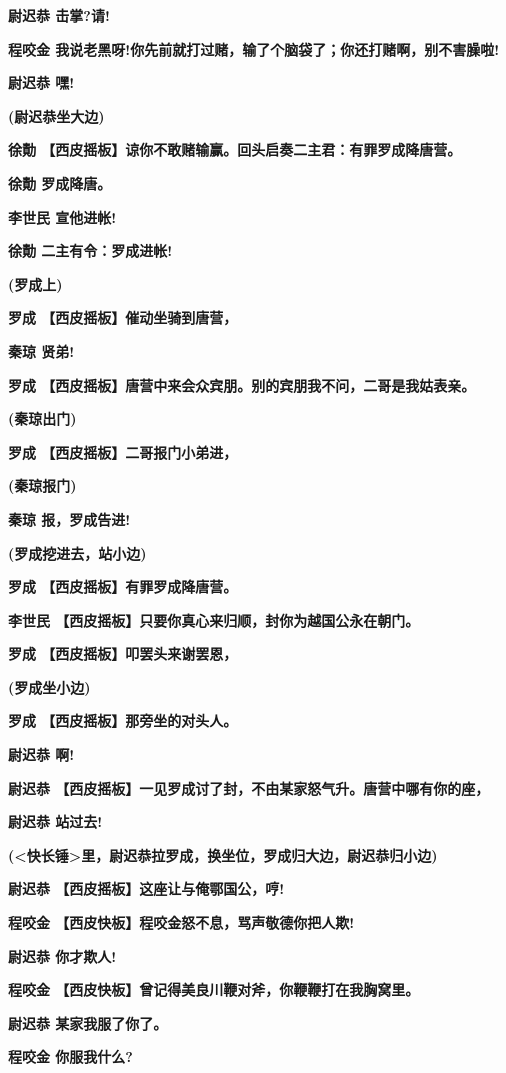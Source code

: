 \textbf{尉迟恭 击掌?请!}

\textbf{程咬金
我说老黑呀!你先前就打过赌，输了个脑袋了；你还打赌啊，别不害臊啦!}

\textbf{尉迟恭 嘿!}

\textbf{(尉迟恭坐大边)}

\textbf{徐勣
【西皮摇板】谅你不敢赌输赢。回头启奏二主君：有罪罗成降唐营。}

\textbf{徐勣 罗成降唐。}

\textbf{李世民 宣他进帐!}

\textbf{徐勣 二主有令：罗成进帐!}

\textbf{(罗成上)}

\textbf{罗成 【西皮摇板】催动坐骑到唐营，}

\textbf{秦琼 贤弟!}

\textbf{罗成
【西皮摇板】唐营中来会众宾朋。别的宾朋我不问，二哥是我姑表亲。}

\textbf{(秦琼出门)}

\textbf{罗成 【西皮摇板】二哥报门小弟进，}

\textbf{(秦琼报门)}

\textbf{秦琼 报，罗成告进!}

\textbf{(罗成挖进去，站小边)}

\textbf{罗成 【西皮摇板】有罪罗成降唐营。}

\textbf{李世民 【西皮摇板】只要你真心来归顺，封你为越国公永在朝门。}

\textbf{罗成 【西皮摇板】叩罢头来谢罢恩，}

\textbf{(罗成坐小边)}

\textbf{罗成 【西皮摇板】那旁坐的对头人。}

\textbf{尉迟恭 啊!}

\textbf{尉迟恭
【西皮摇板】一见罗成讨了封，不由某家怒气升。唐营中哪有你的座，}

\textbf{尉迟恭 站过去!}

\textbf{(\textless{}快长锤\textgreater{}里，尉迟恭拉罗成，换坐位，罗成归大边，尉迟恭归小边)}

\textbf{尉迟恭 【西皮摇板】这座让与俺鄂国公，哼!}

\textbf{程咬金 【西皮快板】程咬金怒不息，骂声敬德你把人欺!}

\textbf{尉迟恭 你才欺人!}

\textbf{程咬金 【西皮快板】曾记得美良川鞭对斧，你鞭鞭打在我胸窝里。}

\textbf{尉迟恭 某家我服了你了。}

\textbf{程咬金 你服我什么?}

